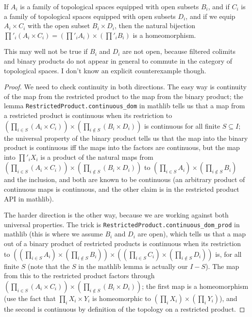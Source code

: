 \begin{lemma}
  \label{Homeomorph.restrictedProductProd}
  \leanok
  If $A_i$ is a family of topological spaces equipped with open
  subsets $B_i$, and if $C_i$ is a family of topological spaces equipped
  with open subsets $D_i$, and if we equip $A_i\times C_i$ with the open
  subset $B_i\times D_i$, then the natural bijection
  $\prod'_i(A_i\times C_i)=\left(\prod'_iA_i\right)\times\left(\prod'_iB_i\right)$
  is a homeomorphism.
\end{lemma}
\begin{remark} This may well not be true if $B_i$ and $D_i$ are not open, because
  filtered colimits and binary products do not appear in general to commute
  in the category of topological spaces. I don't know an explicit counterexample though.
\end{remark}
\begin{proof}
  \leanok
  We need to check continuity in both directions. The easy way is
  continuity of the map from the restricted product to the map from the binary
  product; the lemma {\tt RestrictedProduct.continuous\_dom} in mathlib
  tells us that a map from a restricted product is continuous when its restriction
  to $\left(\prod_{i\in S}(A_i\times C_i)\right)\times\left(\prod_{i\notin S}(B_i\times D_i)\right)$
  is continuous for all finite $S\subseteq I$; the universal property of the binary
  product tells us that the map into the binary product is continuous iff the maps into
  the factors are continuous, but the map into $\prod'_iX_i$ is a product of the
  natural maps from $\left(\prod_{i\in S}(A_i\times C_i)\right)\times\left(\prod_{i\notin S}(B_i\times D_i)\right)$
  to $\left(\prod_{i\in S}A_i\right)\times\left(\prod_{i\notin S}B_i\right)$
  and the inclusion, and both are known to be continuous (an arbitrary product of continuous
  maps is continuous, and the other claim is in the restricted product API in mathlib).

  The harder direction is the other way, because we are working against both universal
  properties. The trick is {\tt RestrictedProduct.continuous\_dom\_prod} in mathlib
  (this is where we assume $B_i$ and $D_i$ are open), which tells us that a map out of
  a binary product of restricted products is continuous when its restriction to
  $\left(\left(\prod_{i\in S}A_i\right)\times\left(\prod_{i\notin S}B_i\right)\right)\times
  \left(\left(\prod_{i\in S}C_i\right)\times\left(\prod_{i\notin S}D_i\right)\right)$
  is, for all finite $S$ (note that the $S$ in the mathlib lemma is actually our $I-S$).
  The map from this to the restricted product factors through
  $\left(\prod_{i\in S}(A_i\times C_i)\right)\times\left(\prod_{i\notin S}(B_i\times D_i)\right)$;
  the first map is a homeomorphism (use the fact that $\prod_iX_i\times Y_i$ is homeomorphic
  to $\left(\prod_iX_i\right)\times\left(\prod_iY_i\right)$), and the second is continuous
  by definition of the topology on a restricted product.
\end{proof}

